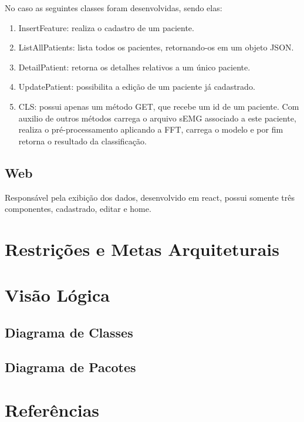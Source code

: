 \begin{anexosenv}
	No caso as seguintes classes foram desenvolvidas, sendo elas:
	\begin{enumerate}
		\item InsertFeature: realiza o cadastro de um paciente.
		\item ListAllPatients: lista todos os pacientes, retornando-os em um objeto JSON.
		\item DetailPatient: retorna os detalhes relativos a um único paciente.
		\item UpdatePatient: possibilita a edição de um paciente já cadastrado.
		\item CLS: possui apenas um método GET, que recebe um id de um paciente. Com auxilio de outros métodos carrega o arquivo sEMG associado a este paciente, realiza o pré-processamento aplicando a FFT, carrega o modelo e por fim retorna o resultado da classificação.
	\end{enumerate}
	
	\subsection{Web}
	Responsável pela exibição dos dados, desenvolvido em react, possui somente três componentes, cadastrado, editar e home.
	
	\section{Restrições e Metas Arquiteturais}
	\section{Visão Lógica}
	\subsection{Diagrama de Classes}
	\subsection{Diagrama de Pacotes}
	\section{Referências}

\end{anexosenv}

